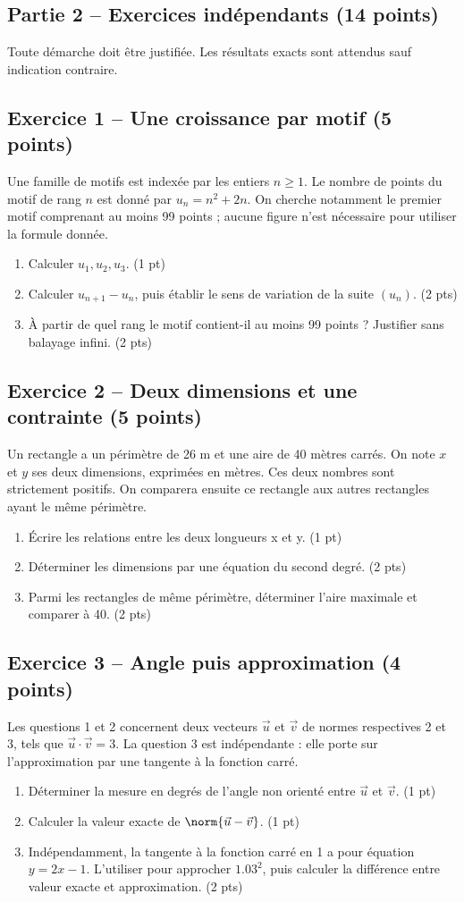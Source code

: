 \mxnewpage\subsection*{Partie 2 -- Exercices indépendants (14 points)}
Toute démarche doit être justifiée. Les résultats exacts sont attendus sauf indication contraire.
\subsection*{Exercice 1 -- Une croissance par motif (5 points)}
Une famille de motifs est indexée par les entiers $n\geq1$. Le nombre de points du motif de rang $n$ est donné par $u_n=n^2+2n$. On cherche notamment le premier motif comprenant au moins 99 points ; aucune figure n’est nécessaire pour utiliser la formule donnée.
\begin{enumerate}
\item Calculer $u_1,u_2,u_3$. \hfill(1 pt)
\item Calculer $u_{n+1}-u_n$, puis établir le sens de variation de la suite $(u_n)$. \hfill(2 pts)
\item À partir de quel rang le motif contient-il au moins 99 points ? Justifier sans balayage infini. \hfill(2 pts)
\end{enumerate}
\subsection*{Exercice 2 -- Deux dimensions et une contrainte (5 points)}
Un rectangle a un périmètre de 26 m et une aire de 40 mètres carrés. On note $x$ et $y$ ses deux dimensions, exprimées en mètres. Ces deux nombres sont strictement positifs. On comparera ensuite ce rectangle aux autres rectangles ayant le même périmètre.
\begin{enumerate}
\item Écrire les relations entre les deux longueurs x et y. \hfill(1 pt)
\item Déterminer les dimensions par une équation du second degré. \hfill(2 pts)
\item Parmi les rectangles de même périmètre, déterminer l’aire maximale et comparer à 40. \hfill(2 pts)
\end{enumerate}
\subsection*{Exercice 3 -- Angle puis approximation (4 points)}
Les questions 1 et 2 concernent deux vecteurs $\vec u$ et $\vec v$ de normes respectives 2 et 3, tels que $\vec u\cdot\vec v=3$. La question 3 est indépendante : elle porte sur l’approximation par une tangente à la fonction carré.
\begin{enumerate}
\item Déterminer la mesure en degrés de l’angle non orienté entre $\vec u$ et $\vec v$. \hfill(1 pt)
\item Calculer la valeur exacte de $\norm{\vec u-\vec v}$. \hfill(1 pt)
\item Indépendamment, la tangente à la fonction carré en 1 a pour équation $y=2x-1$. L’utiliser pour approcher $\num{1,03}^2$, puis calculer la différence entre valeur exacte et approximation. \hfill(2 pts)
\end{enumerate}

